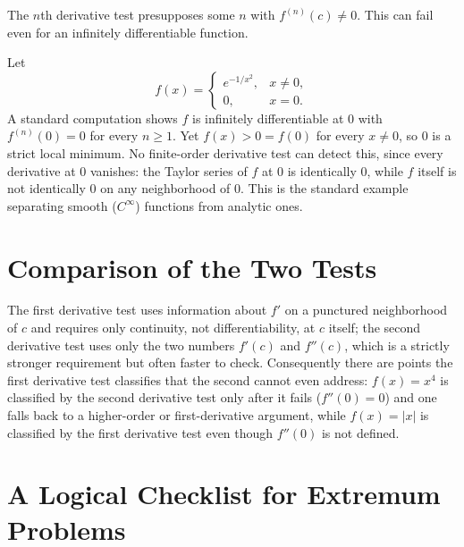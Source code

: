 \documentclass{essay}
\begin{document}
The \(n\)th derivative test presupposes some \(n\) with \(f^{(n)}(c)\neq0\).
This can fail even for an infinitely differentiable function.

\begin{example}
Let
\[
f(x)=\begin{cases}e^{-1/x^2}, & x\neq0,\\0,& x=0.\end{cases}
\]
A standard computation shows \(f\) is infinitely differentiable at \(0\)
with \(f^{(n)}(0)=0\) for every \(n\geq1\). Yet \(f(x)>0=f(0)\) for every
\(x\neq0\), so \(0\) is a strict local minimum. No finite-order derivative
test can detect this, since every derivative at \(0\) vanishes: the Taylor
series of \(f\) at \(0\) is identically \(0\), while \(f\) itself is not
identically \(0\) on any neighborhood of \(0\). This is the standard
example separating smooth (\(C^\infty\)) functions from analytic ones.
\end{example}

\section{Comparison of the Two Tests}

The first derivative test uses information about \(f'\) on a punctured
neighborhood of \(c\) and requires only continuity, not differentiability,
at \(c\) itself; the second derivative test uses only the two numbers
\(f'(c)\) and \(f''(c)\), which is a strictly stronger requirement but
often faster to check. Consequently there are points the first derivative
test classifies that the second cannot even address: \(f(x)=x^4\) is
classified by the second derivative test only after it fails (\(f''(0)=0\))
and one falls back to a higher-order or first-derivative argument, while
\(f(x)=|x|\) is classified by the first derivative test even though
\(f''(0)\) is not defined.

\section{A Logical Checklist for Extremum Problems}
\end{document}
